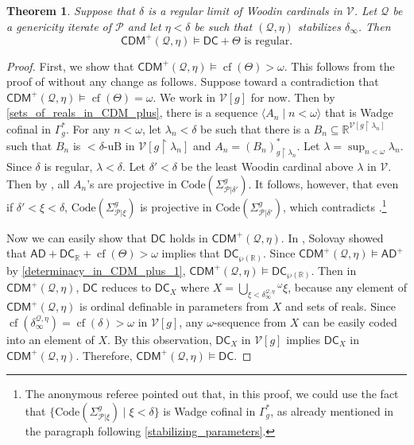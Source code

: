 \documentclass{amsart}
\newtheorem{thm}[dfn]{Theorem}
\renewcommand{\subset}{\subseteq}
\newcommand{\power}{\wp}
\newcommand{\uphar}{\mathbin{\upharpoonright}}
\DeclareMathOperator{\cf}{cf}
\begin{document}
\begin{thm}\label{determinacy_in_CDM_plus_2}
Suppose that $\delta$ is a regular limit of Woodin cardinals in $\mathcal{V}$.
Let $\mathcal{Q}$ be a genericity iterate of $\mathcal{P}$ and 
let $\eta<\delta$ be such that $(\mathcal{Q}, \eta)$ stabilizes $\delta_{\infty}$.
Then
\[\mathsf{CDM}^{+}(\mathcal{Q}, \eta)\models\mathsf{DC}+\Theta\text{ is regular.}
\]
\end{thm}
\begin{proof}
First, we show that $\mathsf{CDM}^+(\mathcal{Q}, \eta)\models\cf(\Theta)>\omega$.
This follows from the proof of \cite[Corollary 3.7]{dm_of_self_it} without any change as follows.
Suppose toward a contradiction that $\mathsf{CDM}^+(\mathcal{Q}, \eta)\models\cf(\Theta)=\omega$.
We work in $\mathcal{V}[g]$ for now.
Then by \cref{sets_of_reals_in_CDM_plus}, there is a sequence $\langle A_n \mid n<\omega\rangle$ that is Wadge cofinal in $\Gamma^*_g$.
For any $n<\omega$, let $\lambda_n<\delta$ be such that there is a $B_n\subset\mathbb{R}^{\mathcal{V}[g\uphar\lambda_n]}$ such that $B_n$ is ${<}\delta$-uB in $\mathcal{V}[g\uphar\lambda_n]$ and $A_n=(B_n)^*_{g\uphar\lambda_n}$.
Let $\lambda=\sup_{n<\omega}\lambda_n$.
Since $\delta$ is regular, $\lambda<\delta$.
Let $\delta'<\delta$ be the least Woodin cardinal above $\lambda$ in $\mathcal{V}$.
Then by \cite[Fact 3.3]{dm_of_self_it}, all $A_n$'s are projective in $\mathrm{Code}(\Sigma^g_{\mathcal{P}\vert\delta'})$.
It follows, however, that even if $\delta'<\xi<\delta$, $\mathrm{Code}(\Sigma^g_{\mathcal{P}\vert\xi})$ is projective in $\mathrm{Code}(\Sigma^g_{\mathcal{P}\vert\delta'})$, which contradicts \cite[Lemma 3.4]{dm_of_self_it}.\footnote{The anonymous referee pointed out that, in this proof, we could use the fact that $\{\mathrm{Code}(\Sigma^g_{\mathcal{P}\vert\xi})\mid\xi<\delta\}$ is Wadge cofinal in $\Gamma^*_g$, as already mentioned in the paragraph following \cref{stabilizing_parameters}.}

Now we can easily show that $\mathsf{DC}$ holds in $\mathsf{CDM}^+(\mathcal{Q}, \eta)$.
In \cite{So21}, Solovay showed that $\mathsf{AD}+\mathsf{DC}_{\mathbb{R}}+\cf(\Theta)>\omega$ implies that $\mathsf{DC}_{\power(\mathbb{R})}$.
Since $\mathsf{CDM}^+(\mathcal{Q}, \eta)\models\mathsf{AD}^+$ by \cref{determinacy_in_CDM_plus_1}, $\mathsf{CDM}^+(\mathcal{Q}, \eta)\models\mathsf{DC}_{\power(\mathbb{R})}$.
Then in $\mathsf{CDM}^+(\mathcal{Q}, \eta)$, $\mathsf{DC}$ reduces to $\mathsf{DC}_X$ where $X=\bigcup_{\xi<\delta^{\mathcal{Q}, \eta}_{\infty}}{}^{\omega}\xi$, because any element of $\mathsf{CDM}^+(\mathcal{Q}, \eta)$ is ordinal definable in parameters from $X$ and sets of reals.
Since $\cf(\delta^{\mathcal{Q}, \eta}_{\infty})=\cf(\delta)>\omega$ in $\mathcal{V}[g]$, any $\omega$-sequence from $X$ can be easily coded into an element of $X$.
By this observation, $\mathsf{DC}_X$ in $\mathcal{V}[g]$ implies $\mathsf{DC}_X$ in $\mathsf{CDM}^+(\mathcal{Q}, \eta)$.
Therefore, $\mathsf{CDM}^+(\mathcal{Q}, \eta)\models\mathsf{DC}$.


\end{proof}
\end{document}
